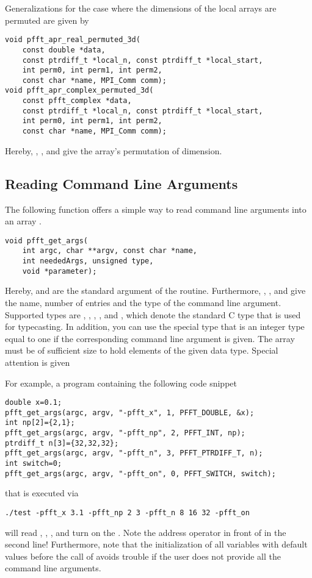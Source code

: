 Generalizations for the case where the dimensions of the local arrays are permuted are given by
\begin{lstlisting}
void pfft_apr_real_permuted_3d(
    const double *data,
    const ptrdiff_t *local_n, const ptrdiff_t *local_start,
    int perm0, int perm1, int perm2,
    const char *name, MPI_Comm comm);
void pfft_apr_complex_permuted_3d(
    const pfft_complex *data,
    const ptrdiff_t *local_n, const ptrdiff_t *local_start,
    int perm0, int perm1, int perm2,
    const char *name, MPI_Comm comm);
\end{lstlisting}
Hereby, , , and  give the array's permutation of dimension.





\subsection{Reading Command Line Arguments}
The following function offers a simple way to read command line arguments into an array .
\begin{lstlisting}
void pfft_get_args(
    int argc, char **argv, const char *name,
    int neededArgs, unsigned type,
    void *parameter);
\end{lstlisting}
Hereby,  and  are the standard argument of the  routine.
Furthermore, , , and  give the name, number of entries and the type of the command line argument.
Supported types are , , , , and ,
which denote the standard C type that is used for typecasting.
In addition, you can use the special type  that is an integer type equal to one if the corresponding command line argument is given.
The array  must be of sufficient size to hold  elements of the given data type.
Special attention is given 

For example, a program containing the following code snippet
\begin{lstlisting}[keywords={double, int, ptrdiff_t}]
double x=0.1;
pfft_get_args(argc, argv, "-pfft_x", 1, PFFT_DOUBLE, &x);
int np[2]={2,1};
pfft_get_args(argc, argv, "-pfft_np", 2, PFFT_INT, np);
ptrdiff_t n[3]={32,32,32};
pfft_get_args(argc, argv, "-pfft_n", 3, PFFT_PTRDIFF_T, n);
int switch=0;
pfft_get_args(argc, argv, "-pfft_on", 0, PFFT_SWITCH, switch);
\end{lstlisting}
that is executed via
\begin{lstlisting}
./test -pfft_x 3.1 -pfft_np 2 3 -pfft_n 8 16 32 -pfft_on
\end{lstlisting}
will read , , , and turn on the .
Note the address operator \code{&} in front of  in the second line!
Furthermore, note that the initialization of all variables with default values before the call of 
avoids trouble if the user does not provide all the command line arguments.

